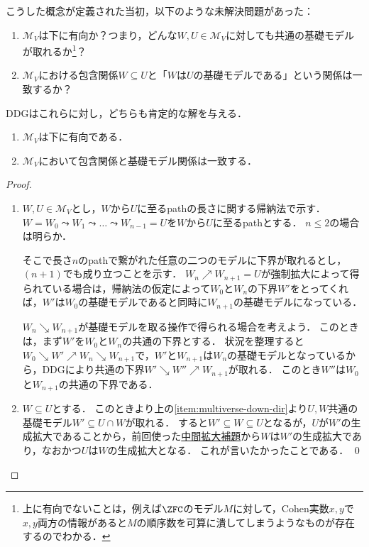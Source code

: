 \documentclass[a4j,leqno]{ltjsarticle}
\newcommand{\DDG}{\mathord{\mathrm{DDG}}}
\begin{document}
こうした概念が定義された当初，以下のような未解決問題があった：
\begin{question}
 \begin{enumerate}
  \item $\mathcal{M}_V$は下に有向か？つまり，どんな$W, U \in \mathcal{M}_V$に対しても共通の基礎モデルが取れるか\footnote{上に有向でないことは，例えば$\ZFC$のモデル$M$に対して，Cohen実数$x,y$で$x,y$両方の情報があると$M$の順序数を可算に潰してしまうようなものが存在するのでわかる．}？
  \item $\mathcal{M}_V$における包含関係$W \subseteq U$と「$W$は$U$の基礎モデルである」という関係は一致するか？
 \end{enumerate}
\end{question}

$\DDG$はこれらに対し，どちらも肯定的な解を与える．

\begin{lemma}
 \begin{enumerate}
  \item \label{item:multiverse-down-dir}$\mathcal{M}_V$は下に有向である．
  \item $\mathcal{M}_V$において包含関係と基礎モデル関係は一致する．
 \end{enumerate}
\end{lemma}
\begin{proof}
 \begin{enumerate}
  \item $W, U \in \mathcal{M}_V$とし，$W$から$U$に至るpathの長さに関する帰納法で示す．
        $W = W_0 \leadsto W_1 \leadsto \dots \leadsto W_{n-1} = U$を$W$から$U$に至るpathとする．
        $n \leq 2$の場合は明らか．

        そこで長さ$n$のpathで繋がれた任意の二つのモデルに下界が取れるとし，$(n+1)$でも成り立つことを示す．
        $W_n \nearrow W_{n+1} = U$が強制拡大によって得られている場合は，帰納法の仮定によって$W_0$と$W_n$の下界$W'$をとってくれば，$W'$は$W_0$の基礎モデルであると同時に$W_{n+1}$の基礎モデルになっている．

        $W_n \searrow W_{n+1}$が基礎モデルを取る操作で得られる場合を考えよう．
        このときは，まず$W'$を$W_0$と$W_n$の共通の下界とする．
        状況を整理すると$W_0 \searrow W' \nearrow W_n \searrow W_{n+1}$で，$W'$と$W_{n+1}$は$W_n$の基礎モデルとなっているから，$\DDG$により共通の下界$W' \searrow W'' \nearrow W_{n+1}$が取れる．
        このとき$W''$は$W_0$と$W_{n+1}$の共通の下界である．
  \item $W \subseteq U$とする．
        このときより上の\ref{item:multiverse-down-dir}より$U, W$共通の基礎モデル$W' \subseteq U \cap W$が取れる．
        すると$W' \subseteq W \subseteq U$となるが，$U$が$W'$の生成拡大であることから，前回使った\href{http://konn-san.com/math/geology-ground-definability.html\#lem:interm-ext}{中間拡大補題}から$W$は$W'$の生成拡大であり，なおかつ$U$は$W$の生成拡大となる．
        これが言いたかったことである． \qed
 \end{enumerate}
\end{proof}
\end{document}
